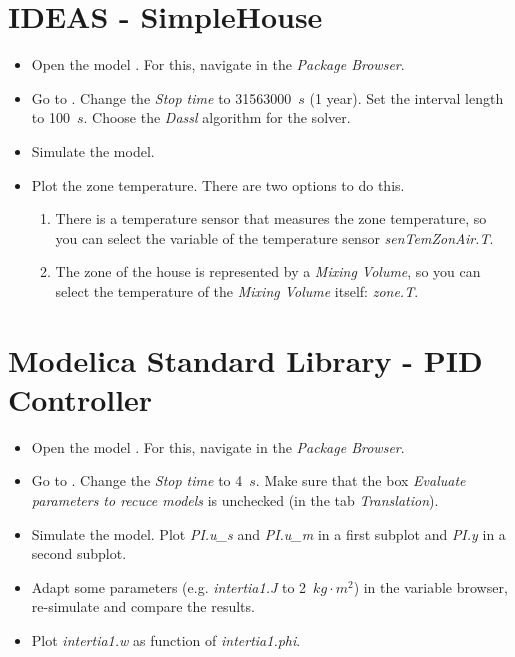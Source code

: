 \documentclass[10pt,a4paper]{article}
\begin{document}
\newpage

\section{IDEAS - SimpleHouse}

\begin{itemize}
	\item Open the model . For this, navigate in the \textit{Package Browser}.
	\item Go to . Change the \textit{Stop time} to 31563000~$s$ (1 year). Set the interval length to 100~$s$. Choose the \textit{Dassl} algorithm for the solver.
	\item Simulate the model.
	\item Plot the zone temperature. There are two options to do this. 
	\begin{enumerate}
		\item There is a temperature sensor that measures the zone temperature, so you can select the variable of the temperature sensor \textit{senTemZonAir.T}.
		\item The zone of the house is represented by a \textit{Mixing Volume}, so you can select the temperature of the \textit{Mixing Volume} itself: \textit{zone.T}.
	\end{enumerate}
\end{itemize}


\section{Modelica Standard Library - PID Controller}

\begin{itemize}
	\item Open the model . For this, navigate in the \textit{Package Browser}.
	\item Go to . Change the \textit{Stop time} to 4~$s$. Make sure that the box \textit{Evaluate parameters to recuce models} is unchecked (in the tab \textit{Translation}).
	\item Simulate the model. Plot \textit{PI.u\_s} and \textit{PI.u\_m} in a first subplot and \textit{PI.y} in a second subplot.
	\item Adapt some parameters (e.g. \textit{intertia1.J} to 2~$kg \cdot m^2$) in the variable browser, re-simulate and compare the results.
	\item Plot \textit{intertia1.w} as function of \textit{intertia1.phi}.
\end{itemize}
\end{document}
